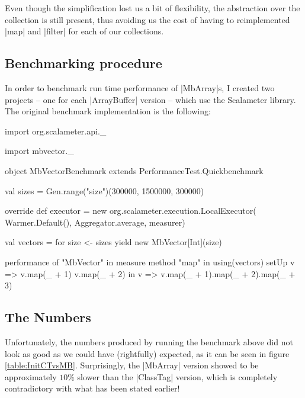 Even though the simplification lost us a bit of flexibility, the abstraction over the collection is still present, thus avoiding us the cost of having to reimplemented |map| and |filter| for each of our collections.

\subsection{Benchmarking procedure}

In order to benchmark run time performance of |MbArray|s, I created two projects -- one for each |ArrayBuffer| version -- which use the Scalameter library. The original benchmark implementation is the following:

\begin{lstlisting-nobreak}
import org.scalameter.api._

import mbvector._

object MbVectorBenchmark extends PerformanceTest.Quickbenchmark {
  val sizes = Gen.range("size")(300000, 1500000, 300000)

  override def executor = new org.scalameter.execution.LocalExecutor(
    Warmer.Default(),
    Aggregator.average,
    measurer)

  val vectors = for {
    size <- sizes
  } yield new MbVector[Int](size)

  performance of "MbVector" in {
    measure method "map" in {
      using(vectors) setUp {
        v => 
          v.map(_ + 1)
          v.map(_ + 2)
      } in {
        v => v.map(_ + 1).map(_ + 2).map(_ + 3)
      }
    }
  }
}
\end{lstlisting-nobreak}

\subsection{The Numbers}

Unfortunately, the numbers produced by running the benchmark above did not look as good as we could have (rightfully) expected, as it can be seen in figure \ref{table:InitCTvsMB}.
Surprisingly, the |MbArray| version showed to be approximately $10\%$ slower than the |ClassTag| version, which is completely contradictory with what has been stated earlier!



